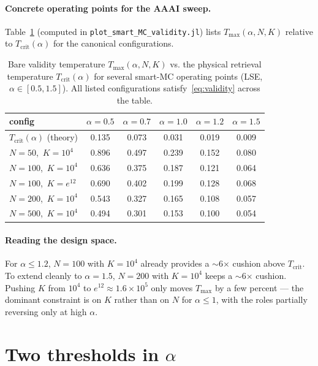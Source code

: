 \documentclass[11pt]{article}
\newcommand{\Tcrit}{T_{\mathrm{crit}}}
\newcommand{\Tmax}{T_{\mathrm{max}}}
\begin{document}
\paragraph{Concrete operating points for the AAAI sweep.} Table~\ref{tab:Tmax} (computed in {\tt plot\_smart\_MC\_validity.jl}) lists $\Tmax(\alpha,N,K)$ relative to $\Tcrit(\alpha)$ for the canonical configurations.

\begin{table}[h]
\centering
\begin{tabular}{lccccc}
\toprule
config & $\alpha\!=\!0.5$ & $\alpha\!=\!0.7$ & $\alpha\!=\!1.0$ & $\alpha\!=\!1.2$ & $\alpha\!=\!1.5$ \\
\midrule
$\Tcrit(\alpha)$ (theory)         & 0.135 & 0.073 & 0.031 & 0.019 & 0.009 \\
\midrule
$N\!=\!50$,\ $K\!=\!10^4$         & 0.896 & 0.497 & 0.239 & 0.152 & 0.080 \\
$N\!=\!100$,\ $K\!=\!10^4$        & 0.636 & 0.375 & 0.187 & 0.121 & 0.064 \\
$N\!=\!100$,\ $K\!=\!e^{12}$      & 0.690 & 0.402 & 0.199 & 0.128 & 0.068 \\
$N\!=\!200$,\ $K\!=\!10^4$        & 0.543 & 0.327 & 0.165 & 0.108 & 0.057 \\
$N\!=\!500$,\ $K\!=\!10^4$        & 0.494 & 0.301 & 0.153 & 0.100 & 0.054 \\
\bottomrule
\end{tabular}
\caption{Bare validity temperature $\Tmax(\alpha,N,K)$ vs. the physical retrieval temperature $\Tcrit(\alpha)$ for several smart-MC operating points (LSE, $\alpha\in[0.5,1.5]$). All listed configurations satisfy~\eqref{eq:validity} across the table.}
\label{tab:Tmax}
\end{table}

\paragraph{Reading the design space.} For $\alpha\!\le\!1.2$, $N\!=\!100$ with $K\!=\!10^4$ already provides a $\sim$6$\times$ cushion above $\Tcrit$. To extend cleanly to $\alpha\!=\!1.5$, $N\!=\!200$ with $K\!=\!10^4$ keeps a $\sim$6$\times$ cushion. Pushing $K$ from $10^4$ to $e^{12}\!\approx\!1.6\!\times\!10^5$ only moves $\Tmax$ by a few percent — the dominant constraint is on $K$ rather than on $N$ for $\alpha\!\le\!1$, with the roles partially reversing only at high $\alpha$.

\section{Two thresholds in $\alpha$}
\end{document}
